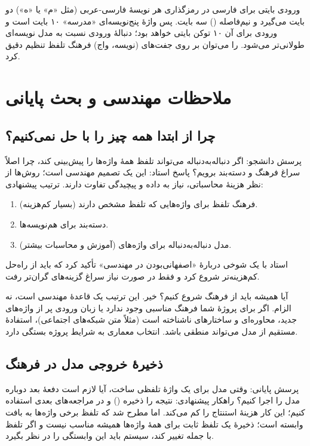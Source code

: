 \begin{addedbox}{ورودی بایتی برای فارسی}
در رمزگذاری  هر نویسهٔ فارسی-عربی (مثل «م» یا «ه») دو بایت می‌گیرد و نیم‌فاصله () سه بایت. پس واژهٔ پنج‌نویسه‌ای «مدرسه» ۱۰ بایت است و ورودی  برای آن ۱۰ توکن بایتی خواهد بود؛ دنبالهٔ ورودی نسبت به مدل نویسه‌ای طولانی‌تر می‌شود.  را می‌توان بر روی جفت‌های (نویسه، واج) فرهنگ تلفظ تنظیم دقیق کرد.
\end{addedbox}

\section{ملاحظات مهندسی  و بحث پایانی}

\subsection{چرا از ابتدا همه چیز را با  حل نمی‌کنیم؟}
پرسش دانشجو: اگر  دنباله‌به‌دنباله می‌تواند تلفظ همهٔ واژه‌ها را پیش‌بینی کند، چرا اصلاً سراغ فرهنگ و دسته‌بند برویم؟ پاسخ استاد: این یک تصمیم مهندسی است؛ روش‌ها از نظر هزینهٔ محاسباتی، نیاز به داده و پیچیدگی تفاوت دارند. ترتیب پیشنهادی:
\begin{enumerate}
  \item فرهنگ تلفظ برای واژه‌هایی که تلفظ مشخص دارند (بسیار کم‌هزینه).
  \item دسته‌بند برای هم‌نویسه‌ها.
  \item مدل  دنباله‌به‌دنباله برای واژه‌های  (آموزش و محاسبات بیشتر).
\end{enumerate}
استاد با یک شوخی دربارهٔ «اصفهانی‌بودن در مهندسی» تأکید کرد که باید از راه‌حل کم‌هزینه‌تر شروع کرد و فقط در صورت نیاز سراغ گزینه‌های گران‌تر رفت.

\begin{exambox}{آیا همیشه باید از فرهنگ شروع کنیم؟}
خیر. این ترتیب یک قاعدهٔ مهندسی است، نه الزام. اگر برای پروژهٔ شما فرهنگ مناسبی وجود ندارد یا زبان ورودی پر از واژه‌های جدید، محاوره‌ای و ساختارهای ناشناخته است (مثلاً متن شبکه‌های اجتماعی)، استفادهٔ مستقیم از مدل  می‌تواند منطقی باشد. انتخاب معماری به شرایط پروژه بستگی دارد.
\end{exambox}

\subsection{ذخیرهٔ خروجی مدل در فرهنگ}
پرسش پایانی: وقتی مدل  برای یک واژهٔ  تلفظی ساخت، آیا لازم است دفعهٔ بعد دوباره مدل را اجرا کنیم؟ راهکار پیشنهادی: نتیجه را ذخیره () و در مراجعه‌های بعدی استفاده کنیم؛ این کار هزینهٔ استنتاج را کم می‌کند. اما مطرح شد که تلفظ برخی واژه‌ها به بافت وابسته است؛ ذخیرهٔ یک تلفظ ثابت برای همهٔ واژه‌ها همیشه مناسب نیست و اگر تلفظ با جمله تغییر کند، سیستم باید این وابستگی را در نظر بگیرد.

